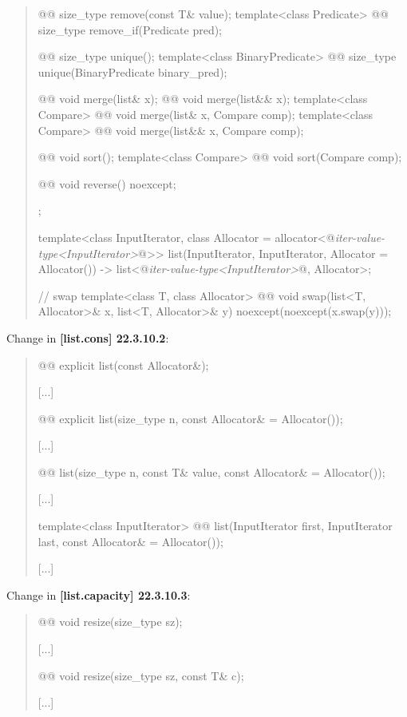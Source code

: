 \documentclass{wg21}
\begin{document}
\begin{quote}
\begin{codeblock}
{{    @@ size_type remove(const T& value);
    template<class Predicate> @@ size_type remove_if(Predicate pred);
    
    @@ size_type unique();
    template<class BinaryPredicate>
    @@ size_type unique(BinaryPredicate binary_pred);
    
    @@ void merge(list& x);
    @@ void merge(list&& x);
    template<class Compare> @@ void merge(list& x, Compare comp);
    template<class Compare> @@ void merge(list&& x, Compare comp);
    
    @@ void sort();
    template<class Compare> @@ void sort(Compare comp);
    
    @@ void reverse() noexcept;
  };

  template<class InputIterator,
           class Allocator = allocator<@\textit{iter-value-type<InputIterator>}@>>
    list(InputIterator, InputIterator, Allocator = Allocator())
      -> list<@\textit{iter-value-type<InputIterator>}@, Allocator>;

  // swap
  template<class T, class Allocator>
    @@ void swap(list<T, Allocator>& x, list<T, Allocator>& y)
      noexcept(noexcept(x.swap(y)));
}
\end{codeblock}%
\end{quote}

Change in \textbf{[list.cons] 22.3.10.2}:
\begin{quote}
\begin{itemdecl}
@@ explicit list(const Allocator&);
\end{itemdecl}
[...]
\begin{itemdecl}
@@ explicit list(size_type n, const Allocator& = Allocator());
\end{itemdecl}
[...]
\begin{itemdecl}
@@ list(size_type n, const T& value, const Allocator& = Allocator());
\end{itemdecl}
[...]
\begin{itemdecl}
template<class InputIterator>
  @@ list(InputIterator first, InputIterator last,
                             const Allocator& = Allocator());
\end{itemdecl}
[...]
\end{quote}

Change in \textbf{[list.capacity] 22.3.10.3}:
\begin{quote}
\begin{itemdecl}
@@ void resize(size_type sz);
\end{itemdecl}
[...]
\begin{itemdecl}
@@ void resize(size_type sz, const T& c);
\end{itemdecl}
[...]
\end{quote}
\end{document}
